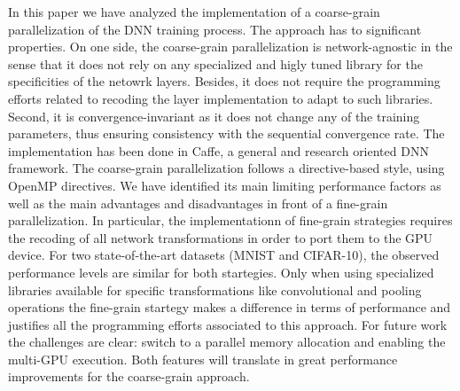 In this paper we have analyzed the implementation of a coarse-grain 
parallelization of the DNN training process. The approach has to 
significant properties. On one side, the coarse-grain parallelization 
is network-agnostic in the sense that it does not rely on any 
specialized and higly tuned library for the specificities of the 
netowrk layers. Besides, it does not require the programming efforts 
related to recoding the layer implementation to adapt to such libraries. 
Second, it is convergence-invariant as it does not change any of the 
training parameters, thus ensuring consistency with the sequential 
convergence rate.  The implementation has 
been done in Caffe, a general and research oriented DNN framework. 
The coarse-grain parallelization follows a directive-based style, 
using OpenMP directives. We have identified its main 
limiting performance factors as well as the main advantages and 
disadvantages in front of a fine-grain parallelization.
In particular, the implementationn of fine-grain strategies requires
the recoding of all network transformations in order to port them 
to the GPU device. For two state-of-the-art datasets (MNIST and CIFAR-10), 
the observed performance levels are similar for both startegies. 
Only when using specialized libraries available for specific transformations 
like convolutional and pooling operations the fine-grain startegy makes a 
difference in terms of performance and justifies all the programming efforts 
associated to this approach.
For future work the challenges are clear: switch to a parallel memory allocation and enabling the multi-GPU execution. Both features will translate in great performance improvements for the coarse-grain approach.
